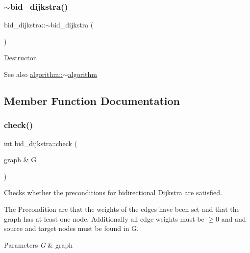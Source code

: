 \subsubsection{\texorpdfstring{$\sim$bid\+\_\+dijkstra()}{~bid\_dijkstra()}}
{\footnotesize\ttfamily bid\+\_\+dijkstra\+::$\sim$bid\+\_\+dijkstra (\begin{DoxyParamCaption}{ }\end{DoxyParamCaption})\hspace{0.3cm}{\ttfamily [virtual]}}



Destructor. 

\begin{DoxySeeAlso}{See also}
\mbox{\hyperlink{classalgorithm_adca9b1e7fa3afd914519a9dbb44e9fd5}{algorithm\+::$\sim$algorithm}} 
\end{DoxySeeAlso}


\subsection{Member Function Documentation}
\mbox{\label{classbid__dijkstra_a504aa04d114f27f2f886ee3b025ad95b}} 
\subsubsection{\texorpdfstring{check()}{check()}}
{\footnotesize\ttfamily int bid\+\_\+dijkstra\+::check (\begin{DoxyParamCaption}\item[{\mbox{\hyperlink{classgraph}{graph}} \&}]{G }\end{DoxyParamCaption})\hspace{0.3cm}{\ttfamily [virtual]}}



Checks whether the preconditions for bidirectional Dijkstra are satisfied. 

The Precondition are that the weights of the edges have been set and that the graph has at least one node. Additionally all edge weights must be $\ge 0$ and and source and target nodes must be found in {\ttfamily G}.


\begin{DoxyParams}{Parameters}
{\em G} & graph\\
\hline
\end{DoxyParams}

